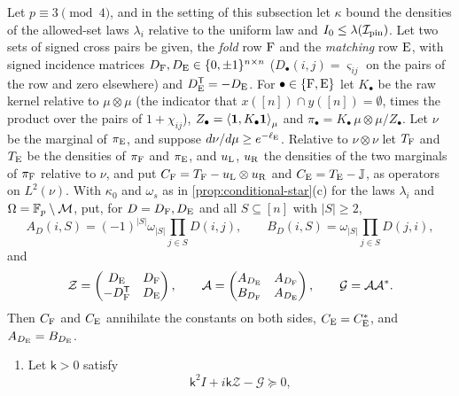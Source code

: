 \begin{lemma}\label{lem:joint-rows}
Let $p\equiv3\pmod4$, and in the setting of this subsection let $\kappa$ bound the
densities of the allowed-set laws $\lambda_i$ relative to the uniform law and
$I_0\le\lambda(\mathcal I_{\rm pin})$. Let two sets of signed cross pairs be given, the
\emph{fold} row $\rm F$ and the \emph{matching} row $\rm E$, with signed incidence
matrices $D_{\rm F},D_{\rm E}\in\{0,\pm1\}^{n\times n}$ ($D_\bullet(i,j)=\varsigma_{ij}$ on
the pairs of the row and zero elsewhere) and $D_{\rm E}^{\mathsf T}=-D_{\rm E}$. For
$\bullet\in\{{\rm F},{\rm E}\}$ let $K_\bullet$ be the raw kernel relative to
$\mu\otimes\mu$ (the indicator that $x([n])\cap y([n])=\emptyset$, times the product over
the pairs of $1+\chi_{ij}$), $Z_\bullet=\left\langle \mathbf 1,K_\bullet\mathbf 1\right\rangle_\mu$ and
$\pi_\bullet=K_\bullet\,\mu\otimes\mu/Z_\bullet$. Let $\nu$ be the marginal of
$\pi_{\rm E}$, and suppose $d\nu/d\mu\ge e^{-\ell_{\rm E}}$. Relative to $\nu\otimes\nu$
let $T_{\rm F}$ and $T_{\rm E}$ be the densities of $\pi_{\rm F}$ and $\pi_{\rm E}$, and
$u_{\rm L}$, $u_{\rm R}$ the densities of the two marginals of
$\pi_{\rm F}$ relative to $\nu$, and put
$C_{\rm F}=T_{\rm F}-u_{\rm L}\otimes u_{\rm R}$ and $C_{\rm E}=T_{\rm E}-\mathbb J$, as
operators on $L^2(\nu)$. With $\kappa_0$ and $\omega_s$ as in
\cref{prop:conditional-star}(c) for the laws $\lambda_i$ and
$\Omega=\mathbb F_p\setminus\mathcal M$, put, for $D=D_{\rm F},D_{\rm E}$ and all
$S\subseteq[n]$ with $|S|\ge2$,
\[
 A_D(i,S)=(-1)^{|S|}\omega_{|S|}\prod_{j\in S}D(i,j),\qquad
 B_D(i,S)=\omega_{|S|}\prod_{j\in S}D(j,i),
\]
and
\[
 \mathcal Z=\begin{pmatrix}D_{\rm E}&D_{\rm F}\\-D_{\rm F}^{\mathsf T}&D_{\rm E}\end{pmatrix},
 \qquad
 \mathcal A=\begin{pmatrix}A_{D_{\rm E}}&A_{D_{\rm F}}\\B_{D_{\rm F}}&A_{D_{\rm E}}\end{pmatrix},
 \qquad\mathcal G=\mathcal A\mathcal A^*.
\]
Then $C_{\rm F}$ and $C_{\rm E}$ annihilate the constants on both sides,
$C_{\rm E}=C_{\rm E}^*$, and $A_{D_{\rm E}}=B_{D_{\rm E}}$.
\begin{enumerate}[label=\textup{(\alph*)}]
\item Let $\mathsf k>0$ satisfy
 \begin{equation}\label{eq:joint-gate}
  \mathsf k^2I+i\mathsf k\mathcal Z-\mathcal G\succeq0,
 \end{equation}

\end{enumerate}
\end{lemma}
